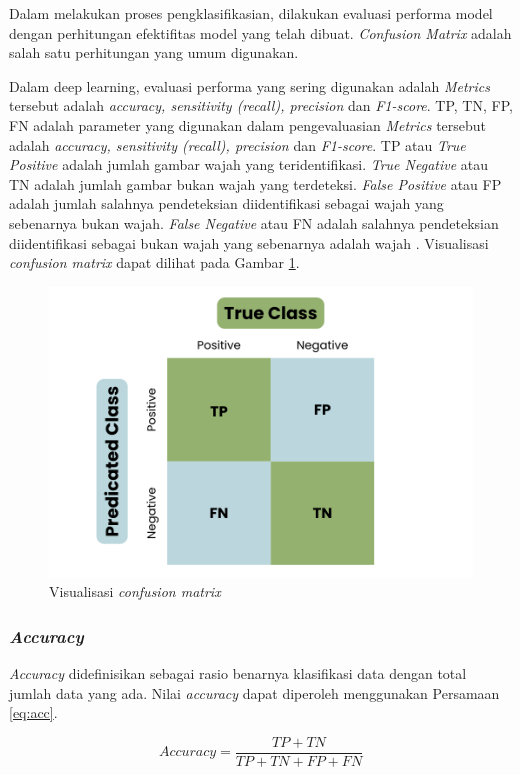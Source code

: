 Dalam melakukan proses pengklasifikasian, dilakukan evaluasi performa model dengan perhitungan efektifitas model yang telah dibuat. \emph{Confusion Matrix} adalah salah satu perhitungan yang umum digunakan.

Dalam deep learning, evaluasi performa yang sering digunakan adalah \emph{Metrics} tersebut adalah \emph{accuracy, sensitivity (recall), precision} dan \emph{F1-score}. TP, TN, FP, FN adalah parameter yang digunakan dalam pengevaluasian \emph{Metrics} tersebut adalah \emph{accuracy, sensitivity (recall), precision} dan \emph{F1-score}. TP atau \emph{True Positive} adalah jumlah gambar wajah yang teridentifikasi. \emph{True Negative} atau TN adalah jumlah gambar bukan wajah yang terdeteksi. \emph{False Positive} atau FP adalah jumlah salahnya pendeteksian diidentifikasi sebagai wajah yang sebenarnya bukan wajah. \emph{False Negative} atau FN adalah salahnya pendeteksian diidentifikasi sebagai bukan wajah yang sebenarnya adalah wajah \parencite{shajihan}. Visualisasi \emph{confusion matrix} dapat dilihat pada Gambar \ref{fig:confusion}.

\begin{figure} [ht] \centering
    \includegraphics[width=.5\textwidth]{gambar/confusionmatrix.png}
    \caption{Visualisasi \emph{confusion matrix}}
    \label{fig:confusion}
\end{figure}

\subsubsection{\emph{Accuracy}}
\label{subsec:acc_klasifikasi}

\emph{Accuracy} didefinisikan sebagai rasio benarnya klasifikasi data dengan total jumlah data yang ada\parencite{Ovalle}. Nilai \emph{accuracy} dapat diperoleh menggunakan Persamaan \ref{eq:acc}. 

\begin{equation}
  \label{eq:acc}
  Accuracy=\frac{TP+TN}{TP+TN+FP+FN}
\end{equation}

